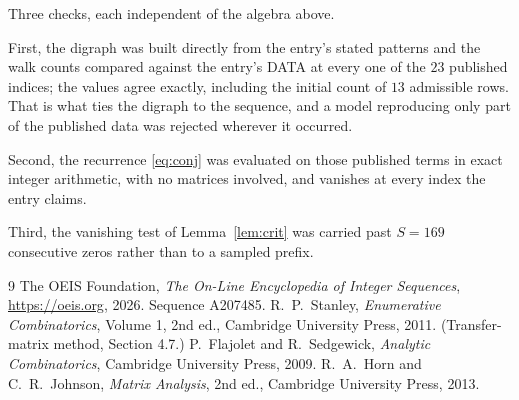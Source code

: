 \documentclass[11pt,a4paper]{article}
\theoremstyle{plain}
\theoremstyle{definition}
\begin{document}
Three checks, each independent of the algebra above.

First, the digraph was built directly from the entry's stated patterns and the walk counts
compared against the entry's DATA at every one of the $23$ published indices; the
values agree exactly, including the initial count of $13$ admissible rows. That is
what ties the digraph to the sequence, and a model reproducing only part of the published
data was rejected wherever it occurred.

Second, the recurrence \eqref{eq:conj} was evaluated on those published terms in exact
integer arithmetic, with no matrices involved, and vanishes at every index the entry claims.

Third, the vanishing test of Lemma~\ref{lem:crit} was carried past $S=169$ consecutive
zeros rather than to a sampled prefix.

\begin{thebibliography}{9}
 The OEIS Foundation, \emph{The On-Line Encyclopedia of Integer
Sequences}, \url{https://oeis.org}, 2026. Sequence A207485.
 R.~P.~Stanley, \emph{Enumerative Combinatorics}, Volume 1, 2nd ed.,
Cambridge University Press, 2011. (Transfer-matrix method, Section 4.7.)
 P.~Flajolet and R.~Sedgewick, \emph{Analytic Combinatorics}, Cambridge
University Press, 2009.
 R.~A.~Horn and C.~R.~Johnson, \emph{Matrix Analysis}, 2nd ed., Cambridge
University Press, 2013.
\end{thebibliography}
\end{document}
